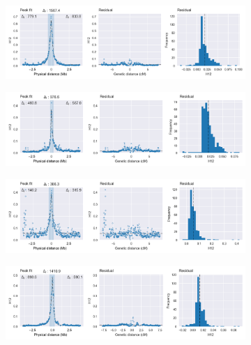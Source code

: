 \begin{refsection}
\begin{figure}[tp]
    \centering
    \begin{subfigure}[t]{0.32\textwidth}
        \centering
        \caption{}
        \includegraphics[width=1.1\textwidth,center,trim=0 0 380 0, clip]{artwork/chapter5/peak_fit_h12_cyp6p_ugs.png}
    \end{subfigure}
    \hfill
    \begin{subfigure}[t]{0.32\textwidth}
        \centering
        \caption{}
        \includegraphics[width=1.1\textwidth,center,trim=0 0 380 0, clip]{artwork/chapter5/peak_fit_h12_cyp6p_bfs.png}
    \end{subfigure}
    \hfill
    \begin{subfigure}[t]{0.32\textwidth}
        \centering
        \caption{}
        \includegraphics[width=1.1\textwidth,center,trim=0 0 380 0, clip]{artwork/chapter5/peak_fit_h12_cyp6p_bfm.png}
    \end{subfigure}
    \vspace{0cm}
    \begin{subfigure}[t]{0.32\textwidth}
        \centering
        \caption{}
        \includegraphics[width=1.1\textwidth,center,trim=0 0 380 0, clip]{artwork/chapter5/peak_fit_h12_gste_cms.png}

\end{subfigure}
\end{figure}
\end{refsection}
